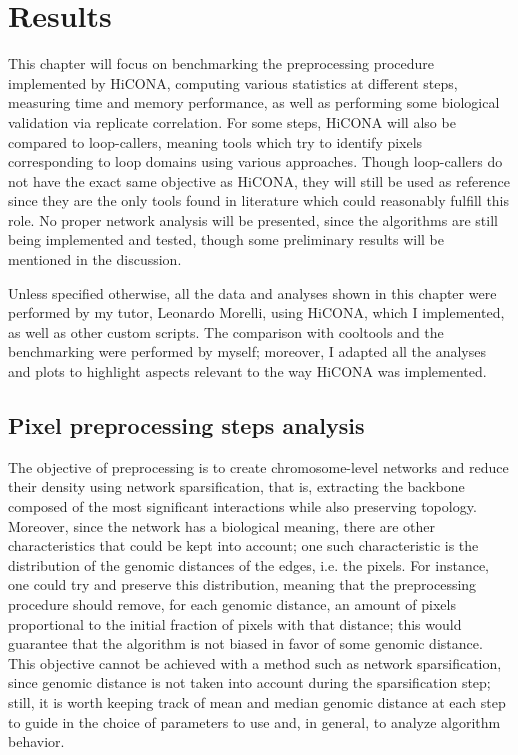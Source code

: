 \graphicspath{{chapters/05_results/images}}
\chapter{Results}


This chapter will focus on benchmarking the preprocessing procedure implemented by HiCONA, computing various statistics at different steps, measuring time and memory performance, as well as performing some biological validation via replicate correlation. For some steps, HiCONA will also be compared to loop-callers, meaning tools which try to identify pixels corresponding to loop domains using various approaches. Though loop-callers do not have the exact same objective as HiCONA, they will still be used as reference since they are the only tools found in literature which could reasonably fulfill this role. No proper network analysis will be presented, since the algorithms are still being implemented and tested, though some preliminary results will be mentioned in the discussion.

Unless specified otherwise, all the data and analyses shown in this chapter were performed by my tutor, Leonardo Morelli, using HiCONA, which I implemented, as well as other custom scripts. The comparison with cooltools and the benchmarking were performed by myself; moreover, I adapted all the analyses and plots to highlight aspects relevant to the way HiCONA was implemented.

\section{Pixel preprocessing steps analysis}

The objective of preprocessing is to create chromosome-level networks and reduce their density using network sparsification, that is, extracting the backbone composed of the most significant interactions while also preserving topology. Moreover, since the network has a biological meaning, there are other characteristics that could be kept into account; one such characteristic is the distribution of the genomic distances of the edges, i.e. the pixels. For instance, one could try and preserve this distribution, meaning that the preprocessing procedure should remove, for each genomic distance, an amount of pixels proportional to the initial fraction of pixels with that distance; this would guarantee that the algorithm is not biased in favor of some genomic distance. This objective cannot be achieved with a method such as network sparsification, since genomic distance is not taken into account during the sparsification step; still, it is worth keeping track of mean and median genomic distance at each step to guide in the choice of parameters to use and, in general, to analyze algorithm behavior. 


